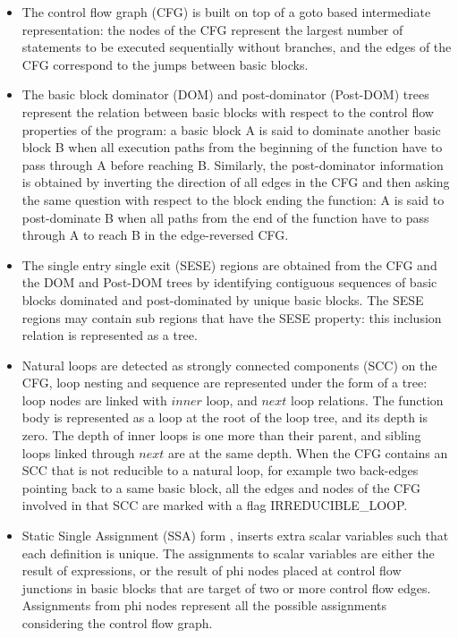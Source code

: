 \documentclass{sigplanconf}
\begin{document}
\begin{itemize}
\item The control flow graph (CFG) \cite{dragonbook} is built on top of a goto
  based intermediate representation: the nodes of the CFG represent the largest
  number of statements to be executed sequentially without branches, and the
  edges of the CFG correspond to the jumps between basic blocks.

\item The basic block dominator (DOM) and post-dominator (Post-DOM) trees
  \cite{dragonbook, ramalingam} represent the relation between basic blocks with respect to
  the control flow properties of the program: a basic block A is said to
  dominate another basic block B when all execution paths from the beginning of
  the function have to pass through A before reaching B.  Similarly, the
  post-dominator information is obtained by inverting the direction of all edges
  in the CFG and then asking the same question with respect to the block ending
  the function: A is said to post-dominate B when all paths from the end of the
  function have to pass through A to reach B in the edge-reversed CFG.

\item The single entry single exit (SESE) regions \cite{sese} are
  obtained from the CFG and the DOM and Post-DOM trees by identifying contiguous
  sequences of basic blocks dominated and post-dominated by unique basic blocks.
  The SESE regions may contain sub regions that have the SESE property: this
  inclusion relation is represented as a tree.

\label{subsec:loop-tree}
\item Natural loops \cite{dragonbook, ramalingam} are detected as strongly connected
  components (SCC) \cite{tarjan} on the CFG, loop nesting and sequence are
  represented under the form of a tree: loop nodes are linked with $inner$ loop,
  and $next$ loop relations.  The function body is represented as a loop at the
  root of the loop tree, and its depth is zero.  The depth of inner loops is one
  more than their parent, and sibling loops linked through $next$ are at the
  same depth.  When the CFG contains an SCC that is not reducible to a natural
  loop, for example two back-edges pointing back to a same basic block, all the
  edges and nodes of the CFG involved in that SCC are marked with a flag
  IRREDUCIBLE\_LOOP.

\item Static Single Assignment (SSA) form \cite{cytron}, inserts extra scalar
  variables such that each definition is unique.  The assignments to scalar
  variables are either the result of expressions, or the result of phi nodes
  placed at control flow junctions in basic blocks that are target of two or
  more control flow edges.  Assignments from phi nodes represent all the
  possible assignments considering the control flow graph.


\end{itemize}
\end{document}
